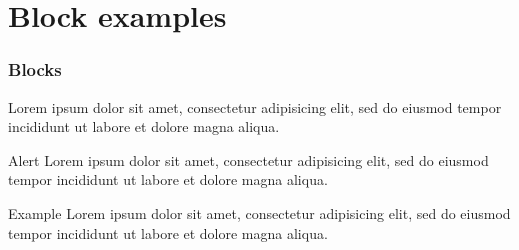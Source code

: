 \documentclass{beamer}
\begin{document}
\section{Block examples}

\begin{frame}
  \frametitle{Blocks}

  \begin{theorem}
    Lorem ipsum dolor sit amet, consectetur adipisicing elit, sed do eiusmod tempor incididunt ut labore et dolore magna aliqua.
  \end{theorem}

  \begin{alertblock}{Alert}
    Lorem ipsum dolor sit amet, consectetur adipisicing elit, sed do eiusmod tempor incididunt ut labore et dolore magna aliqua.
  \end{alertblock}

  \begin{exampleblock}{Example}
    Lorem ipsum dolor sit amet, consectetur adipisicing elit, sed do eiusmod tempor incididunt ut labore et dolore magna aliqua.
  \end{exampleblock}

\end{frame}
\end{document}
